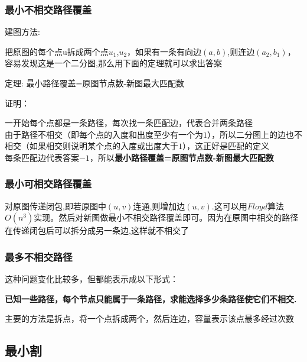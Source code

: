 \documentclass[12pt, a4paper, oneside]{ctexart}
\begin{document}
\subsubsection{最小不相交路径覆盖}
建图方法:\par
\qquad 把原图的每个点u拆成两个点$u_{1}$,$u_{2}$，如果有一条有向边$(a,b)$,则连边$(a_{2},b_{1})$，容易发现这是一个二分图,那么用下面的定理就可以求出答案
\par
定理: 最小路径覆盖=原图节点数-新图最大匹配数
\par
证明：
\par
\qquad 一开始每个点都是一条路径，每次找一条匹配边，代表合并两条路径\\
由于路径不相交（即每个点的入度和出度至少有一个为$1$），所以二分图上的边也不相交（如果相交则说明某个点的入度或出度大于$1$），这正好是匹配的定义\\
每条匹配边代表答案$-1$，所以\textbf{最小路径覆盖=原图节点数-新图最大匹配数}

\subsubsection{最小可相交路径覆盖}
\qquad 对原图传递闭包,即若原图中$(u,v)$连通,则增加边$(u,v)$.这可以用$Floyd$算法$O(n^{3})$实现。然后对新图做最小不相交路径覆盖即可。因为在原图中相交的路径在传递闭包后可以拆分成另一条边,这样就不相交了

\subsubsection{最多不相交路径} 
\qquad  这种问题变化比较多，但都能表示成以下形式：
\par 
\textbf{已知一些路径，每个节点只能属于一条路径，求能选择多少条路径使它们不相交.}
\par
\qquad  主要的方法是拆点，将一个点拆成两个，然后连边，容量表示该点最多经过次数

\newpage
\subsection{最小割}
\end{document}
